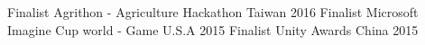 \begin{cvhonors}
  \cvhonor
    {Finalist}
    {Agrithon - Agriculture Hackathon}
    {Taiwan}
    {2016}
  \cvhonor
    {Finalist}
    {Microsoft Imagine Cup world - Game}
    {U.S.A}
    {2015}
  \cvhonor
    {Finalist}
    {Unity Awards}
    {China}
    {2015}
\end{cvhonors}

